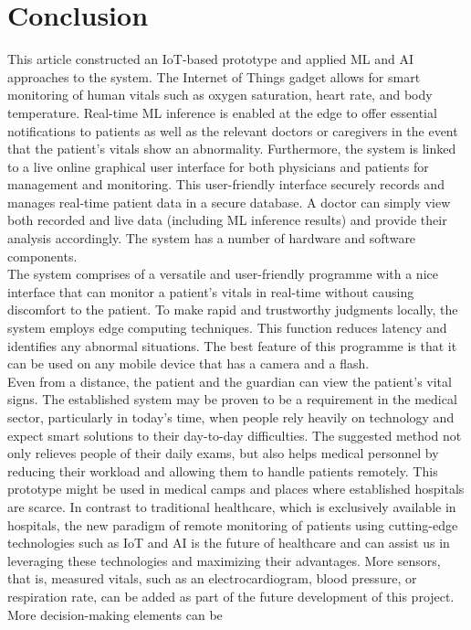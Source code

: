 \documentclass{bmcart}
\begin{document}
\section*{Conclusion}
This article constructed an IoT-based prototype and applied ML and AI approaches
to the system. The Internet of Things gadget allows for smart monitoring of
human vitals such as oxygen saturation, heart rate, and body temperature.
Real-time ML inference is enabled at the edge to offer essential notifications
to patients as well as the relevant doctors or caregivers in the event that the
patient's vitals show an abnormality. Furthermore, the system is linked to a
live online graphical user interface for both physicians and patients for
management and monitoring. This user-friendly interface securely records and
manages real-time patient data in a secure database. A doctor can simply view
both recorded and live data (including ML inference results) and provide their
analysis accordingly. The system has a number of hardware and software
components.\\
The system comprises of a versatile and user-friendly programme with a nice
interface that can monitor a patient's vitals in real-time without causing
discomfort to the patient. To make rapid and trustworthy judgments locally, the
system employs edge computing techniques. This function reduces latency and
identifies any abnormal situations. The best feature of this programme is that
it can be used on any mobile device that has a camera and a flash.\\
Even from a distance, the patient and the guardian can view the patient's vital
signs. The established system may be proven to be a requirement in the medical
sector, particularly in today's time, when people rely heavily on technology and
expect smart solutions to their day-to-day difficulties. The suggested method
not only relieves people of their daily exams, but also helps medical
personnel by reducing their workload and allowing them to handle patients
remotely. This prototype might be used in medical camps and places where
established hospitals are scarce. In contrast to traditional healthcare, which
is exclusively available in hospitals, the new paradigm of remote monitoring of
patients using cutting-edge technologies such as IoT and AI is the future of
healthcare and can assist us in leveraging these technologies and maximizing
their advantages. More sensors, that is, measured vitals, such as an
electrocardiogram, blood pressure, or respiration rate, can be added as part of
the future development of this project. More decision-making elements can be
\end{document}
